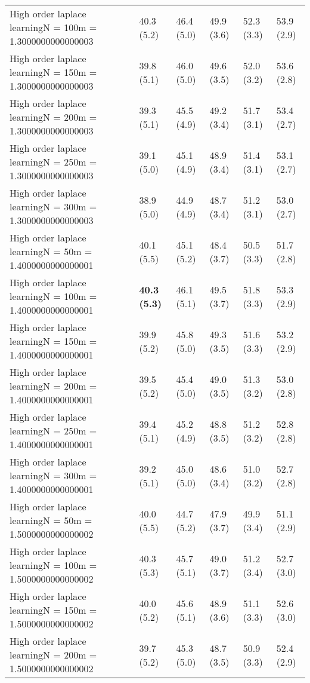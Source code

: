\documentclass{article}
\begin{document}
\begin{table*}[t!]
\begin{center}
\begin{small}
\begin{sc}
\begin{tabular}{llllll}
High order laplace learningN = 100m = 1.3000000000000003&40.3 (5.2)      &46.4 (5.0)      &49.9 (3.6)      &52.3 (3.3)      &53.9 (2.9)      \\
High order laplace learningN = 150m = 1.3000000000000003&39.8 (5.1)      &46.0 (5.0)      &49.6 (3.5)      &52.0 (3.2)      &53.6 (2.8)      \\
High order laplace learningN = 200m = 1.3000000000000003&39.3 (5.1)      &45.5 (4.9)      &49.2 (3.4)      &51.7 (3.1)      &53.4 (2.7)      \\
High order laplace learningN = 250m = 1.3000000000000003&39.1 (5.0)      &45.1 (4.9)      &48.9 (3.4)      &51.4 (3.1)      &53.1 (2.7)      \\
High order laplace learningN = 300m = 1.3000000000000003&38.9 (5.0)      &44.9 (4.9)      &48.7 (3.4)      &51.2 (3.1)      &53.0 (2.7)      \\
High order laplace learningN = 50m = 1.4000000000000001&40.1 (5.5)      &45.1 (5.2)      &48.4 (3.7)      &50.5 (3.3)      &51.7 (2.8)      \\
High order laplace learningN = 100m = 1.4000000000000001&{\bf 40.3 (5.3)}&46.1 (5.1)      &49.5 (3.7)      &51.8 (3.3)      &53.3 (2.9)      \\
High order laplace learningN = 150m = 1.4000000000000001&39.9 (5.2)      &45.8 (5.0)      &49.3 (3.5)      &51.6 (3.3)      &53.2 (2.9)      \\
High order laplace learningN = 200m = 1.4000000000000001&39.5 (5.2)      &45.4 (5.0)      &49.0 (3.5)      &51.3 (3.2)      &53.0 (2.8)      \\
High order laplace learningN = 250m = 1.4000000000000001&39.4 (5.1)      &45.2 (4.9)      &48.8 (3.5)      &51.2 (3.2)      &52.8 (2.8)      \\
High order laplace learningN = 300m = 1.4000000000000001&39.2 (5.1)      &45.0 (5.0)      &48.6 (3.4)      &51.0 (3.2)      &52.7 (2.8)      \\
High order laplace learningN = 50m = 1.5000000000000002&40.0 (5.5)      &44.7 (5.2)      &47.9 (3.7)      &49.9 (3.4)      &51.1 (2.9)      \\
High order laplace learningN = 100m = 1.5000000000000002&40.3 (5.3)      &45.7 (5.1)      &49.0 (3.7)      &51.2 (3.4)      &52.7 (3.0)      \\
High order laplace learningN = 150m = 1.5000000000000002&40.0 (5.2)      &45.6 (5.1)      &48.9 (3.6)      &51.1 (3.3)      &52.6 (3.0)      \\
High order laplace learningN = 200m = 1.5000000000000002&39.7 (5.2)      &45.3 (5.0)      &48.7 (3.5)      &50.9 (3.3)      &52.4 (2.9)      \\

\end{tabular}
\end{sc}
\end{small}
\end{center}
\end{table*}
\end{document}
